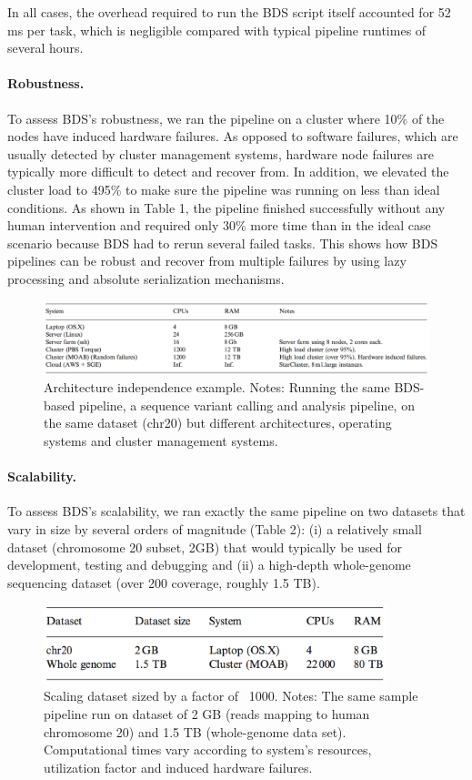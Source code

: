 In all cases, the overhead required to run the BDS script itself accounted for 52 ms per task, which is negligible compared with typical pipeline runtimes of several hours.

\paragraph{Robustness.} To assess BDS’s robustness, we ran the pipeline on a cluster where 10\% of the nodes have induced hardware failures. As opposed to software failures, which are usually detected by cluster management systems, hardware node failures are typically more difficult to detect and recover from. In addition, we elevated the cluster load to 495\% to make sure the pipeline was running on less than ideal conditions. As shown in Table 1, the pipeline finished successfully without any human intervention and required only 30\% more time than in the ideal case scenario because BDS had to rerun several failed tasks. This shows how BDS pipelines can be robust and recover from multiple failures by using lazy processing and absolute serialization mechanisms.

\begin{figure}
    \centering
    \includegraphics[width=14cm]{bds_table_1.png}
    \caption{Architecture independence example. Notes: Running the same BDS-based pipeline, a sequence variant calling and analysis pipeline, on the same dataset (chr20) but different architectures, operating systems and cluster management systems.}
    \label{fig:bdsexec}
\end{figure}

\paragraph{Scalability.} To assess BDS’s scalability, we ran exactly the same pipeline on two datasets that vary in size by several orders of magnitude (Table 2): (i) a relatively small dataset (chromosome 20 subset, 2GB) that would typically be used for development, testing and debugging and (ii) a high-depth whole-genome sequencing dataset (over 200 coverage, roughly 1.5 TB).
 
\begin{figure}
    \centering
    \includegraphics[width=10cm]{bds_table_2.png}
    \caption{Scaling dataset sized by a factor of ~1000. Notes: The same sample pipeline run on dataset of 2 GB (reads mapping to human chromosome 20) and 1.5 TB (whole-genome data set). Computational times vary according to system’s resources, utilization factor and induced hardware failures.}
    \label{fig:bdsexec}
\end{figure}


